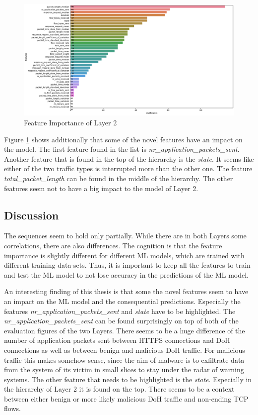 \begin{figure} [h]
\includegraphics[scale=0.42]{images/feature_importance_layer_2.png}
\centering
\caption{Feature Importance of Layer 2}
\label{fig:feat_imp_l2}
\end{figure}

Figure \ref{fig:feat_imp_l2} shows additionally that some of the novel features have an impact on the model. The first feature found in the list is \textit{nr\_application\_packets\_sent}. Another feature that is found in the top of the hierarchy is the \textit{state}. It seems like either of the two traffic types is interrupted more than the other one. The feature \textit{total\_packet\_length} can be found in the middle of the hierarchy. The other features seem not to have a big impact to the model of Layer 2.

\subsection{Discussion}
The sequences \cite{BehnkeEtAl_FeatureEngineeringMLModelMaliciusDoHTraffic} seem to hold only partially. While there are in both Layers some correlations, there are also differences. The cognition is that the feature importance is slightly different for different ML models, which are trained with different training data-sets. Thus, it is important to keep all the features to train and test the ML model to not lose accuracy in the predictions of the ML model. 

An interesting finding of this thesis is that some the novel features seem to have an impact on the ML model and the consequential predictions. Especially the features \textit{nr\_application\_packets\_sent} and \textit{state} have to be highlighted. The \textit{nr\_application\_packets\_sent} can be found surprisingly on top of both of the evaluation figures of the two Layers. There seems to be a huge difference of the number of application packets sent between HTTPS connections and DoH connections as well as between benign and malicious DoH traffic. For malicious traffic this makes somehow sense, since the aim of malware is to exfiltrate data from the system of its victim in small slices to stay under the radar of warning systems. The other feature that needs to be highlighted is the \textit{state}. Especially in the hierarchy of Layer 2 it is found on the top. There seems to be a context between either benign or more likely malicious DoH traffic and non-ending TCP flows.

